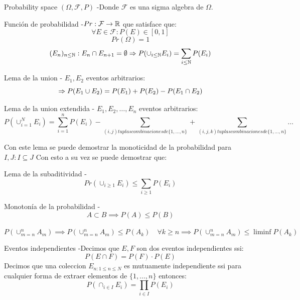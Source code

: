\begin{Definition}{Probability space $(\Omega, \mathcal{F}, P)$}
    -Donde $\mathcal{F}$ es una sigma algebra de $\Omega$.
\end{Definition}

\begin{Definition}{Función de probabilidad}
    -$Pr: \mathcal{F} \to \mathbb{R}$ que satisface que:
    $$ \forall E \in \mathcal{F} : P(E) \in [0, 1]$$
    $$ Pr(\Omega) = 1 $$
    $$ (E_n)_{n \leq \mathbb{N}} : E_n \cap E_{n+1} = \emptyset \Rightarrow P(\cup_{i \leq \mathbb{N}} E_i) = \sum_{i \leq \mathbb{N}} P(E_i) $$
\end{Definition}

\begin{Lemma}{Lema de la union}
    - $E_1, E_2$ eventos arbitrarios:
    $$ \Rightarrow P(E_1 \cup E_2) = P(E_1) + P(E_2) - P(E_1 \cap E_2) $$
\end{Lemma}

\begin{Lemma}{Lema de la union extendida}
    - $E_1, E_2, \dots, E_n$ eventos arbitrarios:
    $$ P(\cup_{i =1}^N E_i) = \sum_{i=1}^n P(E_i) - \sum_{(i, j) tuplas combinaciones de \{1, \dots, n\}}  + \sum_{(i, j, k) tuplas combinaciones de \{1, \dots, n\}}
    \dots $$
\end{Lemma}

Con este lema se puede demostrar la monoticidad de la probabilidad para $I, J: I \subseteq J$
Con esto a su vez se puede demostrar que:

\begin{Lemma}{Lema de la subaditividad}
    - $$Pr(\cup_{i \geq 1} E_i) \leq \sum_{i \geq 1} P(E_i)$$
\end{Lemma}

\begin{Lemma}{Monotonía de la probabilidad}
    - $$ A \subset B \implies P(A) \leq P(B)$$ \\
    $$ P(\cup_{m = n}^n A_m) \implies P(\cup_{m = n}^n A_m) \leq P(A_k) \quad \forall k \geq n \implies P(\cup_{m = n}^n A_m) \leq \liminf P(A_k) $$
\end{Lemma}

\begin{Lemma}{Eventos independientes}
    -Decimos que $E, F$ son dos eventos independientes ssi:
    $$P(E \cap F) = P(F) \cdot P(E) $$
    Decimos que una coleccion $E_{n: 1\leq n \leq N}$ es mutuamente 
    independiente ssi para cualquier forma de extraer elementos de $\{1, \dots, n\}$ entonces:
    $$ P(\cap_{i \in I} E_i) = \prod_{i \in I} P(E_i)$$
\end{Lemma}

